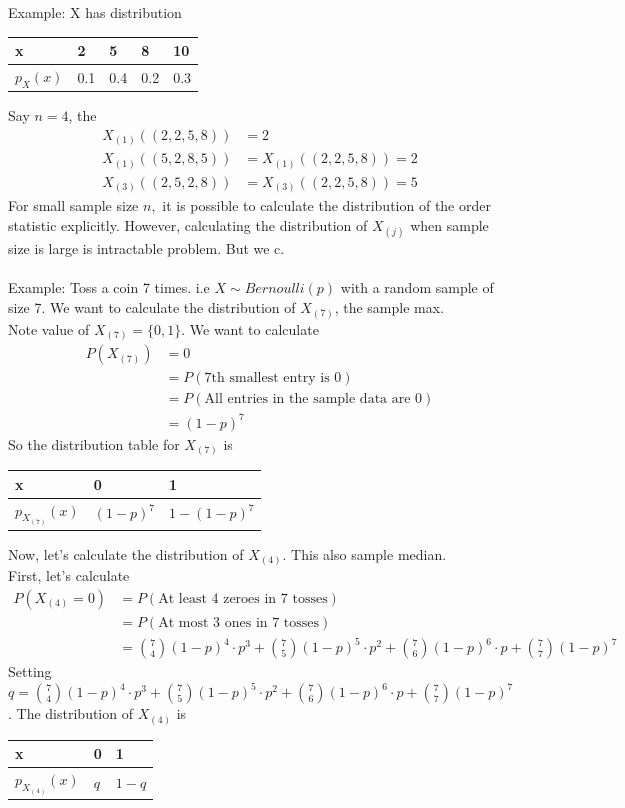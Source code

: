 \documentclass[11pt,oneside]{book}
\theoremstyle{break}
\theoremstyle{break}
\newcommand{\example}{\color{WildStrawberry}Example: \color{black}}
\begin{document}
\example X has distribution \begin{center}
\begin{tabular}{|l|l|l|l|l|}
\hline
x        & 2   & 5   & 8   & 10  \\ \hline
$p_X(x)$ & 0.1 & 0.4 & 0.2 & 0.3 \\ \hline
\end{tabular}
\end{center}
Say $n=4$, the \begin{align*}
X_{(1)}((2,2,5,8))&=2\\
X_{(1)}((5,2,8,5))&=X_{(1)}((2,2,5,8))=2\\
X_{(3)}((2,5,2,8))&=X_{(3)}((2,2,5,8))=5
\end{align*}
For small sample size $n,$ it is possible to calculate the distribution of the order statistic explicitly. However, calculating the distribution of $X_{(j)}$ when sample size is large is intractable problem. But we c.\\
\hfill\\
\example Toss a coin 7 times. i.e $X\sim Bernoulli(p)$ with a random sample of size 7. We want to calculate the distribution of $X_{(7)}$, the sample max.\\
Note value of $X_{(7)}=\{0,1\}$. We want to calculate \begin{align*}
P(X_{(7)})&=0\\
&=P(\text{7th smallest entry is 0})\\
&=P(\text{All entries in the sample data are 0})\\
&=(1-p)^{7}
\end{align*}
So the distribution table for $X_{(7)}$ is \begin{center}
\begin{tabular}{|l|l|l|}
\hline
x                      & 0         & 1           \\ \hline
$p_{X_{(7)}}(x)$ & $(1-p)^7$ & $1-(1-p)^7$ \\ \hline
\end{tabular}
\end{center}
Now, let's calculate the distribution of $X_{(4)}$. This also sample median.\\
First, let's calculate \begin{align*}
P(X_{(4)}=0)&=P(\text{At least 4 zeroes in 7 tosses})\\
&=P(\text{At most 3 ones in 7 tosses})\\
&=\binom 74 (1-p)^4\cdot p^3+\binom 75 (1-p)^5\cdot p^2+\binom 76 (1-p)^6\cdot p+\binom 77 (1-p)^7
\end{align*}
Setting $q=\binom 74 (1-p)^4\cdot p^3+\binom 75 (1-p)^5\cdot p^2+\binom 76 (1-p)^6\cdot p+\binom 77 (1-p)^7$. The distribution of $X_{(4)}$ is\begin{center}
\begin{tabular}{|l|l|l|}
\hline
x                & 0   & 1     \\ \hline
$p_{X_{(4)}}(x)$ & $q$ & $1-q$ \\ \hline
\end{tabular}
\end{center}
\end{document}
